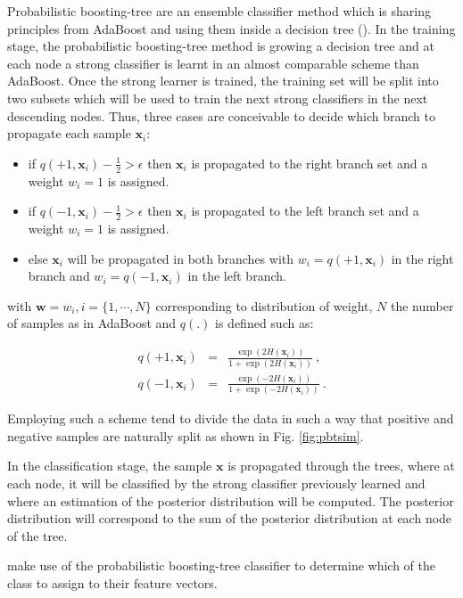 \begin{enumerate}[leftmargin=*]
Probabilistic boosting-tree are an ensemble classifier method which is sharing principles from AdaBoost and using them inside a decision tree (\cite{Tu2005}). In the training stage, the probabilistic boosting-tree method is growing a decision tree and at each node a strong classifier is learnt in an almost comparable scheme than AdaBoost. Once the strong learner is trained, the training set will be split into two subsets which will be used to train the next strong classifiers in the next descending nodes. Thus, three cases are conceivable to decide which branch to propagate each sample $\mathbf{x}_i$:
\begin{itemize}
	\item if $q(+1, \mathbf{x}_i) - \frac{1}{2} > \epsilon$ then $\mathbf{x}_i$ is propagated to the right branch set and a weight $w_i=1$ is assigned. 
	\item if $q(-1, \mathbf{x}_i) - \frac{1}{2} > \epsilon$ then $\mathbf{x}_i$ is propagated to the left branch set and a weight $w_i=1$ is assigned.
	\item else $\mathbf{x}_i$ will be propagated in both branches with $w_i=q(+1, \mathbf{x}_i)$ in the right branch and $w_i=q(-1, \mathbf{x}_i)$ in the left branch.
\end{itemize}

\noindent with $\mathbf{w} = w_i, i=\{1,\cdots,N\}$ corresponding to distribution of weight, $N$ the number of samples as in AdaBoost and $q(.)$ is defined such as:

\begin{eqnarray}
	q(+1, \mathbf{x}_i) & = & \frac{\exp(2H(\mathbf{x}_i))}{1+\exp(2H(\mathbf{x}_i))} \ , \label{eq:regada1} \\
	q(-1, \mathbf{x}_i) & = & \frac{\exp(-2H(\mathbf{x}_i))}{1+\exp(-2H(\mathbf{x}_i))} \ . \label{eq:regada2}
\end{eqnarray}

Employing such a scheme tend to divide the data in such a way that positive and negative samples are naturally split as shown in Fig. \ref{fig:pbtsim}.

In the classification stage, the sample $\mathbf{x}$ is propagated through the trees, where at each node, it will be classified by the strong classifier previously learned and where an estimation of the posterior distribution will be computed. The posterior distribution will correspond to the sum of the posterior distribution at each node of the tree.

\cite{Tiwari2009a,Tiwari2012,Tiwari2010,Viswanath2011} make use of the probabilistic boosting-tree classifier to determine which of the class to assign to their feature vectors.


\end{enumerate}
